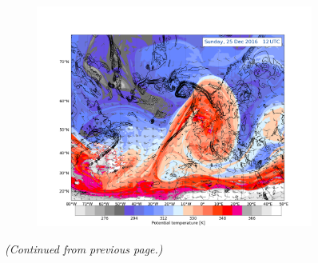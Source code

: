 \begin{figure}
\begin{subfigure}[b]{\textwidth}
		\includegraphics[trim={4.2cm 0cm 4.3cm 36.8cm},clip,
		width=\textwidth]{./fig_DynTropo/20161225_12}
	\end{subfigure}
\caption{\textit{(Continued from previous page.)}}	
\end{figure}